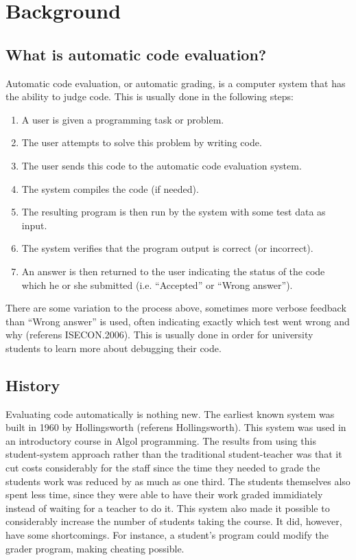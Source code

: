 \chapter{Background}

\section{What is automatic code evaluation?}
Automatic code evaluation, or automatic grading, is a computer system that has the ability to judge code. This is usually done in the following steps:
\begin{enumerate}
  \item A user is given a programming task or problem.
  \item The user attempts to solve this problem by writing code.
  \item The user sends this code to the automatic code evaluation system.
  \item The system compiles the code (if needed).
  \item The resulting program is then run by the system with some test data as input.
  \item The system verifies that the program output is correct (or incorrect). 
  \item An answer is then returned to the user indicating the status of the code which he or she submitted (i.e. ``Accepted'' or ``Wrong answer'').
\end{enumerate}
There are some variation to the process above, sometimes more verbose feedback than ``Wrong answer'' is used, often indicating exactly which test went wrong and why (referens ISECON.2006). This is usually done in order for university students to learn more about debugging their code.

\section{History}
Evaluating code automatically is nothing new. The earliest known system was built in 1960 by Hollingsworth (referens Hollingsworth). This system was used in an introductory course in Algol programming. The results from using this student-system approach rather than the traditional student-teacher was that it cut costs considerably for the staff since the time they needed to grade the students work was reduced by as much as one third. The students themselves also spent less time, since they were able to have their work graded immidiately instead of waiting for a teacher to do it. This system also made it possible to considerably increase the number of students taking the course. It did, however, have some shortcomings. For instance, a student's program could modify the grader program, making cheating possible. 

